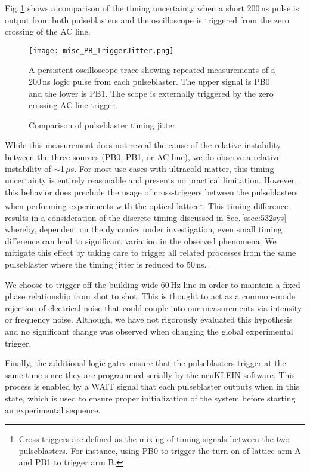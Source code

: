 Fig.\,\ref{fig:pbTimingJitter} shows a comparison of the timing uncertainty when a short 200\,ns pulse is output from both pulseblasters and the oscilloscope is triggered from the zero crossing of the AC line.
	\begin{figure}
		\centerline{
		\texttt{[image: misc\_PB\_TriggerJitter.png]}}
		\caption{Comparison of pulseblaster timing jitter}{A persistent oscilloscope trace showing repeated measurements of a 200\,ns logic pulse from each pulseblaster. The upper signal is PB0 and the lower is PB1. The scope is externally triggered by the zero crossing AC line trigger.}
		\label{fig:pbTimingJitter}
	\end{figure} 
While this measurement does not reveal the cause of the relative instability between the three sources (PB0, PB1, or AC line), we do observe a relative instability of $\sim$1\,$\mu$s.
For most use cases with ultracold matter, this timing uncertainty is entirely reasonable and presents no practical limitation.
However, this behavior does preclude the usage of cross-triggers between the pulseblasters when performing experiments with the optical lattice\footnote{Cross-triggers are defined as the mixing of timing signals between the two pulseblasters.
For instance, using PB0 to trigger the turn on of lattice arm A and PB1 to trigger arm B.}.
This timing difference results in a consideration of the discrete timing discussed in Sec.\,\ref{ssec:532sys} whereby, dependent on the dynamics under investigation, even small timing difference can lead to significant variation in the observed phenomena.
We mitigate this effect by taking care to trigger all related processes from the same pulseblaster where the timing jitter is reduced to 50\,ns.

We choose to trigger off the building wide 60\,Hz line in order to maintain a fixed phase relationship from shot to shot.
This is thought to act as a common-mode rejection of electrical noise that could couple into our measurements via intensity or frequency noise.
Although, we have not rigorously evaluated this hypothesis and no significant change was observed when changing the global experimental trigger.

Finally, the additional logic gates ensure that the pulseblasters trigger at the same time since they are programmed serially by the neuKLEIN software.
This process is enabled by a WAIT signal that each pulseblaster outputs when in this state, which is used to ensure proper initialization of the system before starting an experimental sequence.

